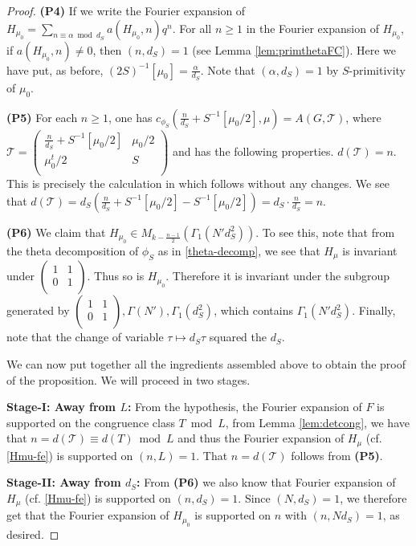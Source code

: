 \documentclass[11pt]{amsart}
\numberwithin{equation}{section}
\newcommand{\mc}{\mathcal}
\newcommand{\smat}[4]{\left( \begin{smallmatrix} #1 & #2 \\ #3 & #4 \\ \end{smallmatrix} \right)}
\begin{document}
\begin{proof}
{\bf(P4)} 
If we write the Fourier expansion of $H_{\mu_0}=\sum_{ n \equiv \alpha \bmod{d_S}} a(H_{\mu_0}, n)q^n$. 
For all $n \ge 1$ in the Fourier expansion of $H_{\mu_0}$, if $ a(H_{\mu_0}, n)\neq 0$, then $(n, d_S)=1$ (see Lemma \ref{lem:primthetaFC}). Here we have put, as before, $(2S)^{-1}[\mu_0] = \frac\alpha{d_S}$. Note that $(\alpha, d_S)=1$ by $S$-primitivity of $\mu_0$. 

{\bf(P5)} 
For each $n \geq 1$, one has $ c_{\phi_S}(\frac{n}{d_S}+S^{-1}[\mu_0/2], \mu) = A(G, \mc T )$, where $\mc T=\smat{\frac{n}{d_S}+S^{-1}[\mu_0/2]}{\mu_0/2}{\mu^t_0/2}{S}$ and has the following properties. $ d(\mc T) = n$. This is precisely the calculation in \cite[Section~3.4.1, 3.4.2]{boche-das} which follows without any changes. We see that $d(\mc T)=d_S(\frac{n}{d_S} +S^{-1}[\mu_0/2] - S^{-1}[\mu_0/2])=d_S\cdot \frac{n}{d_S}=n$.
  
{\bf(P6)} 
We claim that $H_{\mu_0} \in M_{k - \frac{n-1}{2} }(\Gamma_1(N' d_S^2))$. To see this, note that from the theta decomposition of $\phi_S$ as in \eqref{theta-decomp}, we see that $H_\mu$ is invariant under $\smat{1}{1}{0}{1}$. Thus so is $H_{\mu_0}$. 
Therefore it is invariant under the subgroup generated by $\smat{1}{1}{0}{1}, \Gamma(N'), \Gamma_1(d_S^2)$, which contains $\Gamma_1(N'd_S^2)$.
Finally, note that the change of variable $\tau \mapsto d_S \tau$ squared the $d_S$.

We can now put together all the ingredients assembled above to obtain the proof of the proposition. We will proceed in two stages.

\textbf{Stage-I: Away from $L$:}
From the hypothesis, the Fourier expansion of $F$ is supported on the congruence class $T\bmod L$, from Lemma \ref{lem:detcong}, we have that $n=d(\mc T)\equiv d(T)\bmod L$ and thus the Fourier expansion of $H_{\mu}$ (cf. \eqref{Hmu-fe}) is supported on $(n, L)=1$. That $n=d(\mc T)$ follows from {\bf (P5)}.

\textbf{Stage-II: Away from $d_S$:}
From {\bf(P6)} we also know that Fourier expansion of $H_{\mu}$ (cf. \eqref{Hmu-fe}) is supported on $(n, d_S)=1$. Since $(N,d_S)=1$, we therefore get that the Fourier expansion of $H_{\mu_0}$ is supported on $n$ with $(n,Nd_S)=1$, as desired. 


\end{proof}
\end{document}
